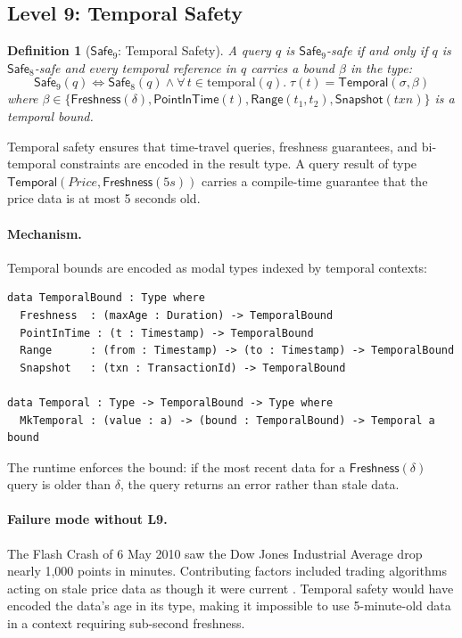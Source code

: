\documentclass[11pt,a4paper]{article}
\newtheorem{definition}[theorem]{Definition}
\newcommand{\LevelN}[1]{\textsf{L#1}}
\newcommand{\Safe}[1]{\ensuremath{\mathsf{Safe}_{#1}}}
\begin{document}
\subsection{Level 9: Temporal Safety}\label{sec:L9}

\begin{definition}[\Safe{9}: Temporal Safety]
A query $q$ is \Safe{9}-safe if and only if $q$ is \Safe{8}-safe and
every temporal reference in $q$ carries a bound $\beta$ in the type:
\[
  \Safe{9}(q) \iff \Safe{8}(q) \land
  \forall\, t \in \mathrm{temporal}(q).\;
  \tau(t) = \mathsf{Temporal}(\sigma, \beta)
\]
where $\beta \in \{\mathsf{Freshness}(\delta), \mathsf{PointInTime}(t),
\mathsf{Range}(t_1, t_2), \mathsf{Snapshot}(\mathit{txn})\}$ is a
temporal bound.
\end{definition}

Temporal safety ensures that time-travel queries, freshness guarantees,
and bi-temporal constraints are encoded in the result type.  A query
result of type $\mathsf{Temporal}(\mathit{Price}, \mathsf{Freshness}(5s))$
carries a compile-time guarantee that the price data is at most 5
seconds old.

\paragraph{Mechanism.}
Temporal bounds are encoded as modal types indexed by temporal contexts:

\begin{lstlisting}[language=Idris2]
data TemporalBound : Type where
  Freshness  : (maxAge : Duration) -> TemporalBound
  PointInTime : (t : Timestamp) -> TemporalBound
  Range      : (from : Timestamp) -> (to : Timestamp) -> TemporalBound
  Snapshot   : (txn : TransactionId) -> TemporalBound

data Temporal : Type -> TemporalBound -> Type where
  MkTemporal : (value : a) -> (bound : TemporalBound) -> Temporal a bound
\end{lstlisting}

The runtime enforces the bound: if the most recent data for a
$\mathsf{Freshness}(\delta)$ query is older than $\delta$, the query
returns an error rather than stale data.

\paragraph{Failure mode without \LevelN{9}.}
The Flash Crash of 6 May 2010 saw the Dow Jones Industrial Average
drop nearly 1,000 points in minutes.  Contributing factors included
trading algorithms acting on stale price data as though it were current
\citep{kirilenko2017flash}.  Temporal safety would have encoded the
data's age in its type, making it impossible to use 5-minute-old data
in a context requiring sub-second freshness.
\end{document}
